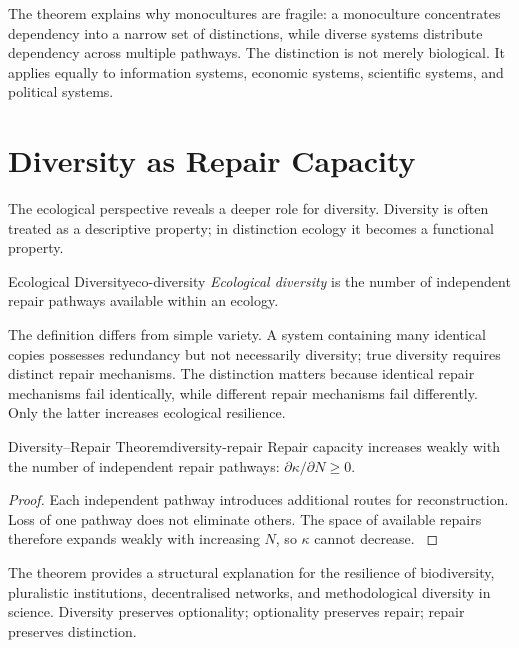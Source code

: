 \documentclass[12pt,twoside,openright]{book}
\begin{document}
The theorem explains why monocultures are fragile: a
monoculture concentrates dependency into a narrow set of
distinctions, while diverse systems distribute dependency
across multiple pathways. The distinction is not merely
biological. It applies equally to information systems,
economic systems, scientific systems, and political
systems.

\section{Diversity as Repair Capacity}
\label{sec:ch12-diversity}

The ecological perspective reveals a deeper role for
diversity. Diversity is often treated as a descriptive
property; in distinction ecology it becomes a functional
property.

\begin{definition}{Ecological Diversity}{eco-diversity}
  \emph{Ecological diversity} is the number of independent
  repair pathways available within an ecology.
\end{definition}

The definition differs from simple variety. A system
containing many identical copies possesses redundancy but
not necessarily diversity; true diversity requires distinct
repair mechanisms. The distinction matters because
identical repair mechanisms fail identically, while
different repair mechanisms fail differently. Only the
latter increases ecological resilience.

\begin{theorem}{Diversity--Repair Theorem}{diversity-repair}
  Repair capacity increases weakly with the number of
  independent repair pathways:
  $\partial\kappa/\partial N \ge 0$.
\end{theorem}

\begin{proof}
  Each independent pathway introduces additional routes for
  reconstruction. Loss of one pathway does not eliminate
  others. The space of available repairs therefore expands
  weakly with increasing $N$, so $\kappa$ cannot decrease.
  \parencite{tilman1996}
\end{proof}

The theorem provides a structural explanation for the
resilience of biodiversity, pluralistic institutions,
decentralised networks, and methodological diversity in
science. Diversity preserves optionality; optionality
preserves repair; repair preserves distinction.
\end{document}
